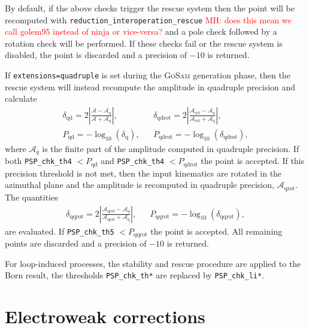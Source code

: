 \documentclass[11pt,a4paper]{refrep}
\newcommand{\gosam}{\textsc{GoSam}\xspace}
\begin{document}
By default, if the above checks trigger the rescue system then the point will be recomputed with \texttt{reduction\_interoperation\_rescue} \textcolor{red}{MH: does this mean we call golem95 instead of ninja or vice-versa?} and a pole check followed by a rotation check will be performed.
If these checks fail or the rescue system is disabled, the point is discarded and a precision of $-10$ is returned.

If \texttt{extensions=quadruple} is set during the \gosam generation phase, then the rescue system will instead recompute the amplitude in quadruple precision and calculate
\begin{align}
&\delta_\mathrm{qd} = 2 \left| \frac{\mathcal{A}-\mathcal{A}_\mathrm{q}}{\mathcal{A}+\mathcal{A}_\mathrm{q}} \right|,&
&\delta_\mathrm{qdrot} = 2 \left| \frac{\mathcal{A}_\mathrm{rot}-\mathcal{A}_\mathrm{q}}{\mathcal{A}_\mathrm{rot}+\mathcal{A}_\mathrm{q}} \right|, & \\
&P_\mathrm{qd} = -\log_\mathrm{10}(\delta_\mathrm{q}),&
&P_\mathrm{qdrot} = -\log_\mathrm{10}(\delta_\mathrm{qdrot}),&
\end{align}
where $\mathcal{A}_q$ is the finite part of the amplitude computed in quadruple precision.
If both \texttt{PSP\_chk\_th4} $< P_\mathrm{qd}$ and \texttt{PSP\_chk\_th4} $< P_\mathrm{qdrot}$ the point is accepted.
If this precision threshold is not met, then the input kinematics are rotated in the azimuthal plane and the amplitude is recomputed in quadruple precision, $\mathcal{A}_\mathrm{qrot}$.
The quantities
\begin{align}
&\delta_\mathrm{qqrot} = 2 \left| \frac{\mathcal{A}_\mathrm{qrot}-\mathcal{A}_\mathrm{q}}{\mathcal{A}_\mathrm{qrot}+\mathcal{A}_\mathrm{q}} \right|,&
&P_\mathrm{qqrot} = -\log_\mathrm{10}(\delta_\mathrm{qqrot}),&
\end{align}
are evaluated.
If \texttt{PSP\_chk\_th5} $< P_\mathrm{qqrot}$ the point is accepted. 
All remaining points are discarded and a precision of $-10$ is returned.

For loop-induced processes, the stability and rescue procedure are applied to the Born result, the thresholds \texttt{PSP\_chk\_th*} are replaced by \texttt{PSP\_chk\_li*}.



\chapter{Electroweak corrections}
\end{document}

